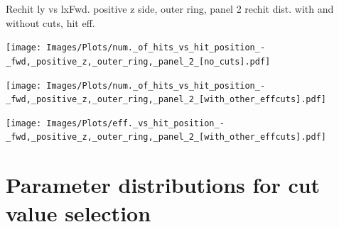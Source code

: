 \documentclass{beamer}
\begin{document}
\begin{frame}{Rechit ly vs lx}{Fwd. positive z side, outer ring, panel 2 rechit dist. with and without cuts, hit eff.}
  \begin{minipage}{0.32\textwidth}
    \centering
    \texttt{[image: Images/Plots/num.\_of\_hits\_vs\_hit\_position\_-\_fwd,\_positive\_z,\_outer\_ring,\_panel\_2\_[no\_cuts].pdf]}
  \end{minipage}%
  \begin{minipage}{0.32\textwidth}
    \centering
    \texttt{[image: Images/Plots/num.\_of\_hits\_vs\_hit\_position\_-\_fwd,\_positive\_z,\_outer\_ring,\_panel\_2\_[with\_other\_effcuts].pdf]}
  \end{minipage}%
  \begin{minipage}{0.32\textwidth}
    \centering
    \texttt{[image: Images/Plots/eff.\_vs\_hit\_position\_-\_fwd,\_positive\_z,\_outer\_ring,\_panel\_2\_[with\_other\_effcuts].pdf]}
  \end{minipage}
\end{frame}

\section{Parameter distributions for cut value selection}
\end{document}

